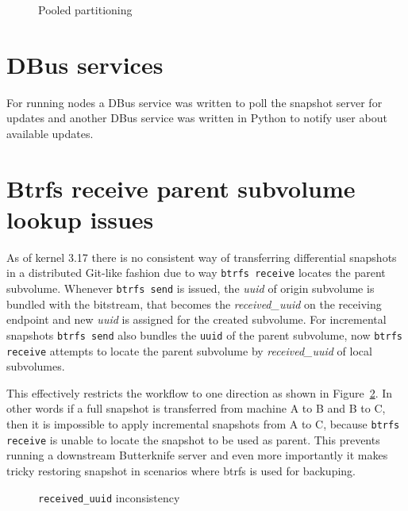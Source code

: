 \documentclass[a4paper,11pt]{kth-mag}
\begin{document}
\begin{figure}[!htb]
\centering
\scalebox{0.5}{}
\caption{Pooled partitioning}
\label{fig:pooled-partitioning}
\end{figure}


\section{DBus services}

For running nodes a DBus service was written to poll the snapshot server
for updates and another DBus service was written in Python to notify user
about available updates.

\section{Btrfs receive parent subvolume lookup issues}

As of kernel 3.17 there is no consistent way of transferring
differential snapshots in a distributed Git-like fashion due to way
\lstinline!btrfs receive! locates the parent subvolume.
Whenever \lstinline!btrfs send! is issued, the \emph{uuid} of origin
subvolume is bundled with the bitstream, that becomes
the \emph{received\_uuid} on the receiving endpoint and
new \emph{uuid} is assigned for the created subvolume.
For incremental snapshots \lstinline!btrfs send! also bundles
the \lstinline!uuid! of the parent subvolume,
now \lstinline!btrfs receive! attempts to locate the parent
subvolume by \emph{received\_uuid} of local subvolumes.

This effectively restricts the workflow to one direction
as shown in Figure~\ref{fig:btrfs-received-uuid-issue}.
In other words if a full snapshot is transferred
from machine A to B and B to C, then it is impossible
to apply incremental snapshots from A to C, because
\lstinline!btrfs receive! is unable to locate the snapshot
to be used as parent.
This prevents running a downstream Butterknife server and
even more importantly it makes tricky restoring snapshot
in scenarios where \acrshort{btrfs} is used for backuping.

\begin{figure}[!htb]
\centering
\scalebox{0.5}{}
\caption{\lstinline!received_uuid! inconsistency}
\label{fig:btrfs-received-uuid-issue}
\end{figure}
\end{document}
